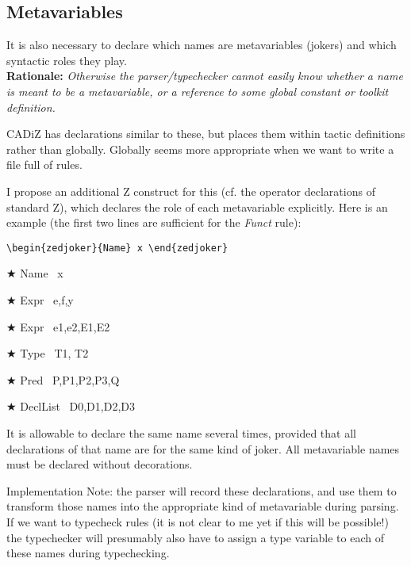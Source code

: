 \documentclass{article}
\newenvironment{Rationale}{\\ \textbf{Rationale:}\it}{}
\newenvironment{zedjoker}[1]{\par$\bigstar$ #1\ }{}
\begin{document}
\subsection{Metavariables}

It is also necessary to declare which names are metavariables
(jokers) and which syntactic roles they play.
\begin{Rationale}
  Otherwise the parser/typechecker cannot easily know whether
  a name is meant to be a metavariable, or a reference to some
  global constant or toolkit definition.

  CADiZ has declarations similar to these, but places them
  within tactic definitions rather than globally.  Globally
  seems more appropriate when we want to write a file full
  of rules.
\end{Rationale}

I propose an additional Z construct for this (cf. the operator
declarations of standard Z), which declares the role of each metavariable
explicitly.  Here is an example (the first two lines are sufficient for
the \emph{Funct} rule):

\begin{verbatim}
\begin{zedjoker}{Name} x \end{zedjoker}
\end{verbatim}

\begin{zedjoker}{Name} x \end{zedjoker}
\begin{zedjoker}{Expr} e,f,y \end{zedjoker}
\begin{zedjoker}{Expr} e1,e2,E1,E2 \end{zedjoker}
\begin{zedjoker}{Type} T1, T2 \end{zedjoker}
\begin{zedjoker}{Pred} P,P1,P2,P3,Q \end{zedjoker}
\begin{zedjoker}{DeclList} D0,D1,D2,D3 \end{zedjoker}

It is allowable to declare the same name several times, provided
that all declarations of that name are for the same kind of joker.
All metavariable names must be declared without decorations.  

Implementation Note: the parser will record these declarations,
and use them to transform those names into the appropriate kind
of metavariable during parsing.  If we want to typecheck rules
(it is not clear to me yet if this will be possible!) the typechecker will
presumably also have to assign a type variable to each of these names
during typechecking.
\end{document}
